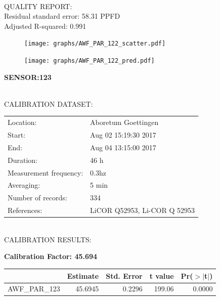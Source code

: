 \documentclass[oneside]{report}
\begin{document}
\hrulefill\\
QUALITY REPORT:\\
Residual standard error: 58.31 PPFD\\
Adjusted R-squared: 0.991



\begin{figure}[H]
  \centering
  \texttt{[image: graphs/AWF\_PAR\_122\_scatter.pdf]}
\end{figure}




\begin{figure}[H]
  \centering
  \texttt{[image: graphs/AWF\_PAR\_122\_pred.pdf]}
\end{figure}

\pagebreak


\begin{center}
\large{\textbf{SENSOR:123}}\\
\end{center}

\hrulefill\\
CALIBRATION DATASET:\\
\begin{table}[h!]
  \centering
  \label{tab:table1}
  \begin{tabular}{ll}
    Location: & Aboretum Goettingen\\ 
    
    
    Start:  & Aug 02 15:19:30 2017 \\
    End:   & Aug 04 13:15:00 2017\\ 
    Duration: & 46 h\\
    Measurement frequency: & 0.3hz\\
    Averaging:  &5 min\\
    Number of records: & 334 \\
    References: & LiCOR Q52953, Li-COR Q 52953 \\
  \end{tabular}
\end{table}

\hrulefill\\
CALIBRATION RESULTS:\\


\begin{center}
\textbf{\large{Calibration Factor: 45.694}}\\
\end{center}
\begin{table}[ht]
\centering
\begin{tabular}{rrrrr}
  \hline
 & Estimate & Std. Error & t value & Pr($>$$|$t$|$) \\ 
  \hline
AWF\_PAR\_123 & 45.6945 & 0.2296 & 199.06 & 0.0000 \\ 
   \hline
\end{tabular}
\end{table}
\end{document}

